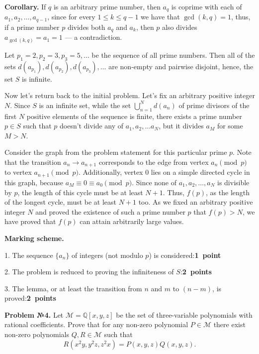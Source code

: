 \documentclass[12pt]{article}
\newcounter{problem}
\def\avtor#1{\linebreak[2] \hspace*{\fill}{\small (\mbox{\textit{#1})}}}
\def \Problem#1{\par \bigskip \textbf{Problem №{#1}. }}
\def \marking{\par \bigskip \textbf{Marking scheme. }}
\def \corollary{\par \bigskip \textbf{Corollary. }}
\def\leq{\leqslant}
\begin{document}
\corollary If $q$ is an arbitrary prime number, then $a_{q}$ is coprime with each of $a_1, a_2, \ldots, a_{q - 1}$, since for every $1 \leq k \leq q - 1$ we have that $\gcd(k, q) = 1$, thus, if a prime number $p$ divides both $a_q$ and $a_k$, then $p$ also divides $a_{\gcd(k, q)} = a_1 = 1$ --- a contradiction.

\medskip

Let $p_1 = 2, p_2 = 3, p_3 = 5, \ldots$ be the sequence of all prime numbers. Then all of the sets $d(a_{p_1}), d(a_{p_2}), d(a_{p_3}), \ldots$ are non-empty and pairwise disjoint, hence, the set $S$ is infinite.

Now let's return back to the initial problem. Let's fix an arbitrary positive integer $N$. Since $S$ is an infinite set, while the set $\bigcup_{n = 1}^{N} d(a_{n})$ of prime divisors of the first $N$ positive elements of the sequence is finite, there exists a prime number $p \in S$ such that $p$ doesn't divide any of $a_1, a_2, \ldots a_N$, but it divides $a_M$ for some $M > N$.

Consider the graph from the problem statement for this particular prime $p$. Note that the transition $a_n \to a_{n + 1}$ corresponds to the edge from vertex $a_n \pmod{p}$ to vertex $a_{n + 1} \pmod{p}$. Additionally, vertex $0$ lies on a simple directed cycle in this graph, because $a_M \equiv 0 \equiv a_0 \pmod{p}$. Since none of $a_1, a_2, \ldots, a_N$ is divisible by $p$, the length of this cycle must be at least $N + 1$. Thus, $f(p)$, as the length of the longest cycle, must be at least $N + 1$ too. As we fixed an arbitrary positive integer $N$ and proved the existence of such a prime number $p$ that $f(p) > N$, we have proved that $f(p)$ can attain arbitrarily large values.

\marking

1. The sequence $\{ a_n \}$ of integers (not modulo $p$) is considered:\dotfill\textbf{1~point}

2. The problem is reduced to proving the infiniteness of $S$:\dotfill\textbf{2~points}

3. The lemma, or at least the transition from $n$ and $m$ to $(n - m)$, is proved:\dotfill\textbf{2~points}


\Problem{4} Let $\mathcal{M} = \mathbb{Q}[x, y, z]$ be the set of three-variable polynomials with rational coefficients. Prove that for any non-zero polynomial $P \in \mathcal{M}$ there exist non-zero polynomials $Q, R \in \mathcal{M}$ such that
$$
R(x^2 y, y^2 z, z^2 x)
=
P(x, y, z) Q(x, y, z)
.
$$ \avtor{Navid Safaei}
\end{document}
